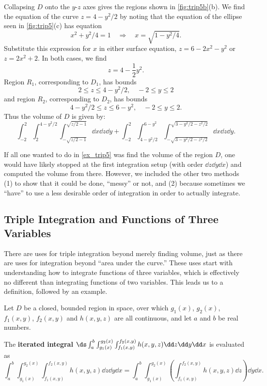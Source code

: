 \begin{example}
Collapsing $D$ onto the $y$-$z$ axes gives the regions shown in \autoref{fig:trip5b}(b). We find the equation of the curve $z=4-y^2/2$ by noting that the equation of the ellipse seen in \autoref{fig:trip5}(c) has equation 
\[x^2+y^2/4=1 \quad \Rightarrow \quad x = \sqrt{1-y^2/4}.\]  
Substitute this expression for $x$ in either surface equation, $z=6-2x^2-y^2$ or $z=2x^2+2$. In both cases, we find
\[z=4-\frac12y^2.\]
Region $R_1$, corresponding to $D_1$, has bounds
\[2\leq z\leq 4-y^2/2,\quad -2\leq y\leq 2\]
and region $R_2$, corresponding to $D_2$, has bounds
\[4-y^2/2\leq z\leq 6-y^2,\quad -2\leq y\leq 2.\]
Thus the volume of $D$ is given by:
\[\int_{-2}^2\int_2^{4-y^2/2}\int_{-\sqrt{z/2-1}}^{\sqrt{z/2-1}}\dd x\dd z\dd y +\int_{-2}^2\int_{4-y^2/2}^{6-y^2}\int_{-\sqrt{3-y^2/2-z^2/2}}^{\sqrt{3-y^2/2-z^2/2}}\dd x\dd z\dd y.\]
\end{example}

If all one wanted to do in \autoref{ex_trip5} was find the volume of the region $D$, one would have likely stopped at the first integration setup (with order $\dd z\dd y\dd x$) and computed the volume from there. However, we included the other two methods (1) to show that it could be done, ``messy'' or not, and (2) because sometimes we ``have'' to use a less desirable order of integration in order to actually integrate.

\subsection{Triple Integration and Functions of Three Variables}

There are uses for triple integration beyond merely finding volume, just as there are uses for integration beyond ``area under the curve.'' These uses start with understanding how to integrate functions of three variables, which is effectively no different than integrating functions of two variables. This leads us to a definition, followed by an example.

{
\begin{definition}\label{def:triple_integral_2}%
Let $D$ be a closed, bounded region in space, over which $g_1(x)$, $g_2(x)$, $f_1(x,y)$, $f_2(x,y)$ and $h(x,y,z)$ are all continuous, and let $a$ and $b$ be real numbers.\bigskip

The \textbf{iterated integral} $\ds \int_a^b\int_{g_1(x)}^{g_2(x)}\int_{f_1(x,y)}^{f_2(x,y)} h(x,y,z)\dd z\dd y\dd x$ is evaluated as
\small
\[
\int_a^b\int_{g_1(x)}^{g_2(x)}\int_{f_1(x,y)}^{f_2(x,y)} h(x,y,z)\dd z\dd y\dd x
= \int_a^b\int_{g_1(x)}^{g_2(x)}\left(\int_{f_1(x,y)}^{f_2(x,y)} h(x,y,z)\dd z\right)\dd y\dd x.
\]
\end{definition}}


